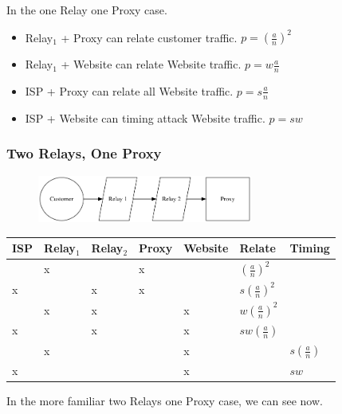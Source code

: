 \documentclass{article}
\begin{document}
In the one Relay one Proxy case.


\begin{itemize}
\item Relay$_1$ + Proxy can relate customer traffic. $p = (\frac{a}{n})^2$
\item Relay$_1$ + Website can relate Website traffic. $p = w\frac{a}{n}$
\item ISP + Proxy can relate all Website traffic. $p = s\frac{a}{n}$
\item ISP + Website can timing attack Website traffic. $p = sw$
\end{itemize}

\subsubsection{Two Relays, One Proxy}

\begin{figure}[htbp]
  \centering
  \includegraphics[width = 200pt]{sttc}
  \caption{}
\end{figure}

\begin{center}
\begin{tabular}{l | l | l | l | l | l | l}
  ISP & Relay$_1$ & Relay$_2$ & Proxy & Website & Relate             & Timing \\
  \hline
      & x         &           & x     &         & $(\frac{a}{n})^2$  & \\
  \hline
  x   &           & x         & x     &         & $s(\frac{a}{n})^2$ & \\
  \hline
      & x         & x         &       & x       & $w(\frac{a}{n})^2$ & \\
  \hline
  x   &           & x         &       & x       & $sw(\frac{a}{n})$  & \\
  \hline
      & x         &           &       & x       &                    & $s(\frac{a}{n})$ \\
  \hline
  x   &           &           &       & x       &                    & $sw$ \\
\end{tabular}
\end{center}

In the more familiar two Relays one Proxy case, we can see now.
\end{document}
